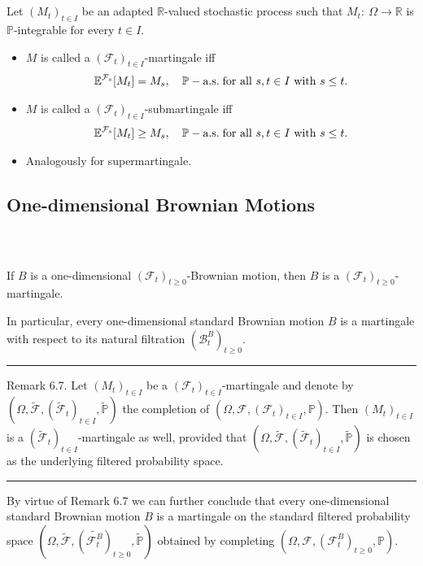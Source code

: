 \documentclass{beamer}
\numberwithin{equation}{section}
\newcommand{\task}[1]{
    \begin{center}
        \colorbox{red}{
            \textsf{
                \textbf{#1}
            }
        }
    \end{center}
}
\newenvironment{frame2}{\begin{frame}\frametitle{{\normalsize \secname} \\ {\large \subsecname}}}{\end{frame}}
\begin{document}
\begin{frame2}
    Let $(M_t)_{t\in I}$ be an adapted $\mathbb{R}$-valued stochastic process such that $M_t: \ \Omega \rightarrow \mathbb{R}$ is $\mathbb{P}$-integrable for every $t\in I$.
    \begin{itemize}
        \item<-1> $M$ is called a $(\mathcal{F}_t)_{t\in I}$-martingale iff
        \begin{align}
            \mathbb{E}^{\mathcal{F}_s}[M_t] = M_s, \quad \mathbb{P}-\text{a.s.\! for all } s,t \in I \text{ with } s\leq t.
        \end{align}
        \item<2-> $M$ is called a $(\mathcal{F}_t)_{t\in I}$-submartingale iff
        \begin{align}
            \mathbb{E}^{\mathcal{F}_s}[M_t] \geq M_s, \quad \mathbb{P}-\text{a.s.\! for all } s,t \in I \text{ with } s\leq t.
        \end{align}
        \item<3-> Analogously for supermartingale.
    \end{itemize}
\end{frame2}

\subsection{One-dimensional Brownian Motions}

\begin{frame2}
    If $B$ is a one-dimensional $(\mathcal{F}_t)_{t\geq 0}$-Brownian motion, then $B$ is a $(\mathcal{F}_t)_{t\geq 0}$-martingale.

    In particular, every one-dimensional standard Brownian motion $B$ is a martingale with respect to its natural filtration $(\mathcal{B}_t^B)_{t\geq 0}$.
    \vspace{5pt}
    \hrule
    \vspace{5pt}
    Remark 6.7. Let $(M_t)_{t \in I}$ be a $(\mathcal{F}_t)_{t\in I}$-martingale and denote by $(\Omega, \tilde{\mathcal{F}},(\tilde{\mathcal{F}}_t)_{t\in I},\tilde{\mathbb{P}})$ the completion of $(\Omega, \mathcal{F},(\mathcal{F}_t)_{t\in I},\mathbb{P})$.
    Then $(M_t)_{t\in I}$ is a $(\tilde{\mathcal{F}}_t)_{t\in I}$-martingale as well, provided that $(\Omega, \tilde{\mathcal{F}},(\tilde{\mathcal{F}}_t)_{t\in I},\tilde{\mathbb{P}})$ is chosen as the underlying filtered probability space.
    \vspace{5pt}
    \hrule
    \vspace{5pt}
    By virtue of Remark 6.7 we can further conclude that every one-dimensional standard Brownian motion $B$ is a martingale on the standard filtered probability space $(\Omega, \tilde{\mathcal{F}},(\tilde{\mathcal{F}_t^B})_{t\geq 0},\tilde{\mathbb{P}})$ obtained by completing $(\Omega, \mathcal{F},(\mathcal{F}_t^B)_{t\geq 0},\mathbb{P})$.
\end{frame2}
\end{document}
